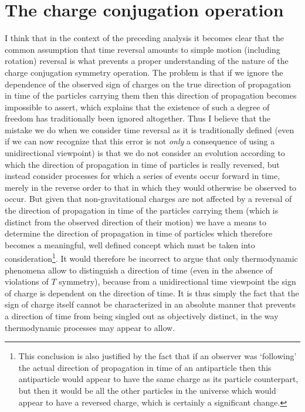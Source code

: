 \documentclass[notitlepage,12pt]{report}
\begin{document}
\section{The charge conjugation operation}

I think that in the context of the preceding analysis it becomes clear that the common assumption that time reversal amounts to simple motion (including rotation) reversal is what prevents a proper understanding of the nature of the charge conjugation symmetry operation. The problem is that if we ignore the dependence of the observed sign of charges on the true direction of propagation in time of the particles carrying them then this direction of propagation becomes impossible to assert, which explains that the existence of such a degree of freedom has traditionally been ignored altogether. Thus I believe that the mistake we do when we consider time reversal as it is traditionally defined (even if we can now recognize that this error is not \textit{only} a consequence of using a unidirectional viewpoint) is that we do not consider an evolution according to which the direction of propagation in time of particles is really reversed, but instead consider processes for which a series of events occur forward in time, merely in the reverse order to that in which they would otherwise be observed to occur. But given that non-gravitational charges are not affected by a reversal of the direction of propagation in time of the particles carrying them (which is distinct from the observed direction of their motion) we have a means to determine the direction of propagation in time of particles which therefore becomes a meaningful, well defined concept which must be taken into consideration\footnote{This conclusion is also justified by the fact that if an observer was `following' the actual direction of propagation in time of an antiparticle then this antiparticle would appear to have the same charge as its particle counterpart, but then it would be all the other particles in the universe which would appear to have a reversed charge, which is certainly a significant change.}. It would therefore be incorrect to argue that only thermodynamic phenomena allow to distinguish a direction of time (even in the absence of violations of $T$ symmetry), because from a unidirectional time viewpoint the sign of charge is dependent on the direction of time. It is thus simply the fact that the sign of charge itself cannot be characterized in an absolute manner that prevents a direction of time from being singled out as objectively distinct, in the way thermodynamic processes may appear to allow.
\end{document}
